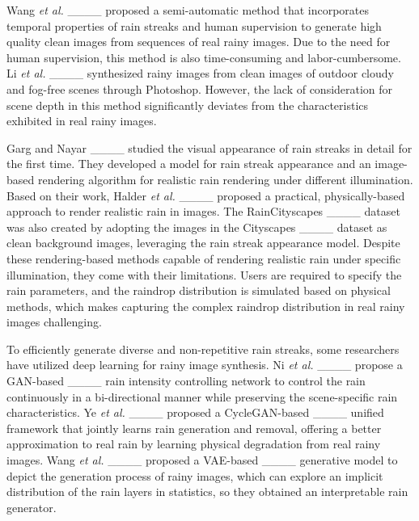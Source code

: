 Wang \MakeLowercase{\textit{et al.}} ____ proposed a semi-automatic method that incorporates temporal properties of rain streaks and human supervision to generate high quality clean images from sequences of real rainy images. Due to the need for human supervision, this method is also time-consuming and labor-cumbersome. Li \MakeLowercase{\textit{et al.}} ____ synthesized rainy images from clean images of outdoor cloudy and fog-free scenes through Photoshop. However, the lack of consideration for scene depth in this method significantly deviates from the characteristics exhibited in real rainy images.

Garg and Nayar ____ studied the visual appearance of rain streaks in detail for the first time. They developed a model for rain streak appearance and an image-based rendering algorithm for realistic rain rendering under different illumination. Based on their work, Halder \MakeLowercase{\textit{et al.}} ____ proposed a practical, physically-based approach to render realistic rain in images. The RainCityscapes ____ dataset was also created by adopting the images in the Cityscapes ____ dataset as clean background images, leveraging the rain streak appearance model. Despite these rendering-based methods capable of rendering realistic rain under specific illumination, they come with their limitations. Users are required to specify the rain parameters, and the raindrop distribution is simulated based on physical methods, which makes capturing the complex raindrop distribution in real rainy images challenging.

To efficiently generate diverse and non-repetitive rain streaks, some researchers have utilized deep learning for rainy image synthesis. Ni \MakeLowercase{\textit{et al.}} ____ propose a GAN-based ____ rain intensity controlling network to control the rain continuously in a bi-directional manner while preserving the scene-specific rain characteristics. Ye \MakeLowercase{\textit{et al.}} ____ proposed a CycleGAN-based ____ unified framework that jointly learns rain generation and removal, offering a better approximation to real rain by learning physical degradation from real rainy images. Wang \MakeLowercase{\textit{et al.}} ____ proposed a VAE-based ____ generative model to depict the generation process of rainy images, which can explore an implicit distribution of the rain layers in statistics, so they obtained an interpretable rain generator.

